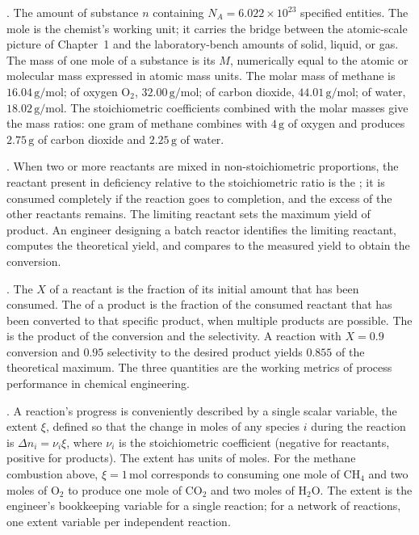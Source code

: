 . The amount of substance $n$ containing $N_A = 6.022
\times 10^{23}$ specified entities. The mole is the chemist's working
unit; it carries the bridge between the atomic-scale picture of
Chapter~1 and the laboratory-bench amounts of solid, liquid, or gas.
The mass of one mole of a substance is its  $M$,
numerically equal to the atomic or molecular mass expressed in atomic
mass units. The molar mass of methane is $16.04\,\text{g}/\text{mol}$;
of oxygen O$_2$, $32.00\,\text{g}/\text{mol}$; of carbon dioxide,
$44.01\,\text{g}/\text{mol}$; of water, $18.02\,\text{g}/\text{mol}$.
The stoichiometric coefficients combined with the molar masses give
the mass ratios: one gram of methane combines with $4\,\text{g}$ of
oxygen and produces $2.75\,\text{g}$ of carbon dioxide and $2.25\,
\text{g}$ of water.

. When two or more reactants are mixed in
non-stoichiometric proportions, the reactant present in deficiency
relative to the stoichiometric ratio is the ; it is consumed completely if the reaction goes to
completion, and the excess of the other reactants remains. The
limiting reactant sets the maximum yield of product. An engineer
designing a batch reactor identifies the limiting reactant, computes
the theoretical yield, and compares to the measured yield to obtain
the conversion.

. The  $X$ of a
reactant is the fraction of its initial amount that has been
consumed. The  of a product is the fraction of
the consumed reactant that has been converted to that specific
product, when multiple products are possible. The  is
the product of the conversion and the selectivity. A reaction with
$X = 0.9$ conversion and $0.95$ selectivity to the desired product
yields $0.855$ of the theoretical maximum. The three quantities are
the working metrics of process performance in chemical engineering.

. A reaction's progress is conveniently
described by a single scalar variable, the extent $\xi$, defined so
that the change in moles of any species $i$ during the reaction is
$\Delta n_i = \nu_i \xi$, where $\nu_i$ is the stoichiometric
coefficient (negative for reactants, positive for products). The
extent has units of moles. For the methane combustion above, $\xi =
1\,\text{mol}$ corresponds to consuming one mole of CH$_4$ and two
moles of O$_2$ to produce one mole of CO$_2$ and two moles of
H$_2$O. The extent is the engineer's bookkeeping variable for a
single reaction; for a network of reactions, one extent variable per
independent reaction.

